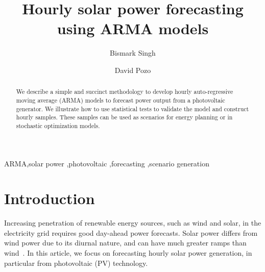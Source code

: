 \documentclass[review]{elsarticle}
\begin{document}
\begin{frontmatter}

\title{Hourly solar power forecasting using ARMA models}

\author{Bismark Singh}
\address{Discrete Mathematics \& Optimization, Sandia National Laboratories 
}


\author{David Pozo}
\address{Center for Energy Systems, Skolkovo Institute of Science and 
Technology}

\begin{abstract}
We describe a simple and succinct methodology to develop hourly auto-regressive 
moving 
average (ARMA) models to forecast power output from a photovoltaic generator. 
We illustrate how to use 
statistical tests to validate the model and construct hourly samples. These 
samples can be used as scenarios for energy planning or in stochastic 
optimization models.
\end{abstract}

\begin{keyword}
ARMA\sep solar power \sep photovoltaic \sep forecasting \sep scenario 
generation
\end{keyword}

\end{frontmatter}

\linenumbers

\section{Introduction}
Increasing penetration of renewable energy sources, such as wind and solar, in 
the electricity grid requires good day-ahead power forecasts. Solar power 
differs from wind power due to its diurnal nature, and can have much greater 
ramps than wind~\cite{graabak2016variability}. In this article, we focus 
on forecasting  hourly solar power generation, in particular from photovoltaic 
(PV) technology. 
\end{document}

